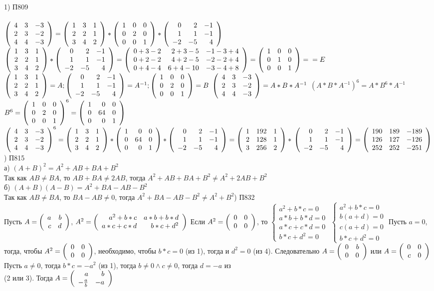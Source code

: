 \documentclass[12pt, a4paper]{article}
\begin{document}
	1) П809 \\
	\\
	$\matthree{4}{3}{-3}{2}{3}{-2}{4}{4}{-3} = \matthree{1}{3}{1}{2}{2}{1}{3}{4}{2} * \matthree{1}{0}{0}{0}{2}{0}{0}{0}{1} * \matthree{0}{2}{-1}{1}{1}{-1}{-2}{-5}{4}$\bspace
	$\matthree{1}{3}{1}{2}{2}{1}{3}{4}{2} * \matthree{0}{2}{-1}{1}{1}{-1}{-2}{-5}{4} = \matthree{0 + 3 - 2}{2 + 3 - 5}{-1 -3 + 4}{0 + 2 - 2}{4 + 2 - 5}{-2 -2  + 4}{0 + 4 - 4}{6 + 4 -10}{- 3 - 4 + 8} = \matthree{1}{0}{0}{0}{1}{0}{0}{0}{1} = \bspace  = E$
	\bspace 
	$\matthree{1}{3}{1}{2}{2}{1}{3}{4}{2}  = A; \matthree{0}{2}{-1}{1}{1}{-1}{-2}{-5}{4} = A^{-1}; \matthree{1}{0}{0}{0}{2}{0}{0}{0}{1} = B$\bspace
	$\matthree{4}{3}{-3}{2}{3}{-2}{4}{4}{-3}  = A* B * A^{-1} $\bspace
	$(A* B * A^{-1}) ^ 6 = A * B ^ 6 * A ^ {-1 }$\bspace
	$B^6 = \matthree{1}{0}{0}{0}{2}{0}{0}{0}{1} ^ 6 = \matthree{1}{0}{0}{0}{64}{0}{0}{0}{1}$ \bspace
	$\matthree{4}{3}{-3}{2}{3}{-2}{4}{4}{-3} ^ 6 = \matthree{1}{3}{1}{2}{2}{1}{3}{4}{2} * \matthree{1}{0}{0}{0}{64}{0}{0}{0}{1} * \matthree{0}{2}{-1}{1}{1}{-1}{-2}{-5}{4} = \matthree{1}{192}{1}{2}{128}{1}{3}{256}{2} * \bspace \matthree{0}{2}{-1}{1}{1}{-1}{-2}{-5}{4} = \matthree{190}{189}{-189}{126}{127}{-126}{252}{252}{-251}$
	) П815 \\
	а) $(A + B) ^ 2 = A ^ 2 + AB + BA + B ^ 2$\\
	Так как $AB \neq BA$, то $AB + BA \neq 2AB$, тогда $A ^ 2 + AB + BA + B ^ 2 \neq A ^ 2 + 2AB  + B ^ 2$\\
	б) $(A + B)(A - B) = A ^ 2 + BA - AB - B ^ 2$\\
	Так как $AB \neq BA$, то $BA - AB \neq 0$, тогда $A ^ 2 + BA - AB - B ^ 2 \neq A ^ 2 + B ^ 2$) П832\\
	Пусть $A = \mattwo{a}{b}{c}{d}$, $A ^ 2 = \mattwo{a ^ 2  + b * c}{a * b + b * d}{a * c + c * d}{b * c + d ^ 2}$\bspace
	Если $A ^ 2 = \zeromat$, то $\left \{ \begin{array}{c} a ^ 2 + b  * c = 0 \\ a * b + b * d = 0 \\ a * c + c * d  = 0 \\ b * c + d ^ 2 = 0 \end{array} \right . $ 
	$\left \{ \begin{array}{c} a ^ 2 + b  * c = 0 \\ b (a + d) = 0 \\ c (a + d)  = 0 \\ b * c + d ^ 2 = 0 \end{array} \right . $ \bspace
	Пусть $a = 0$, тогда, чтобы $ A ^ 2 = \zeromat$, необходимо, чтобы $b * c = 0$ (из 1), тогда и $d ^ 2 = 0$ (из 4). Следовательно $A = \mattwo{0}{b}{0}{0}$ или $A = \mattwo{0}{0}{c}{0}$ \bspace
	Пусть $a \neq 0$, тогда $b * c = -a ^ 2$ (из 1), тогда $b \neq 0 \land c \neq 0$, тогда $d = -a$ из \\ (2 или 3). Тогда $A = \mattwo{a}{b}{-\frac{a}{b}}{-a}$\bspace
	
\end{document}
